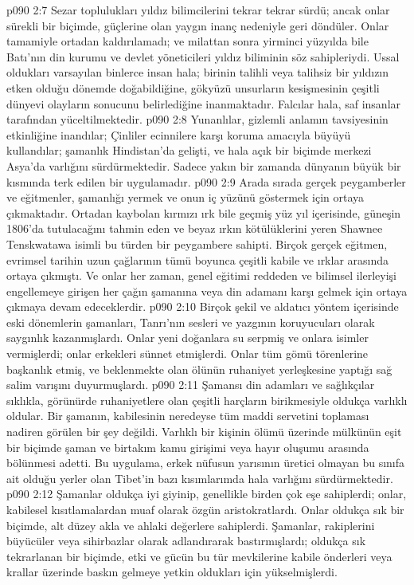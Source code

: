 \vs p090 2:7 Sezar toplulukları yıldız bilimcilerini tekrar tekrar sürdü; ancak onlar sürekli bir biçimde, güçlerine olan yaygın inanç nedeniyle geri döndüler. Onlar tamamiyle ortadan kaldırılamadı; ve milattan sonra yirminci yüzyılda bile Batı’nın din kurumu ve devlet yöneticileri yıldız biliminin söz sahipleriydi. Ussal oldukları varsayılan binlerce insan hala; birinin talihli veya talihsiz bir yıldızın etken olduğu dönemde doğabildiğine, gökyüzü unsurların kesişmesinin çeşitli dünyevi olayların sonucunu belirlediğine inanmaktadır. Falcılar hala, saf insanlar tarafından yüceltilmektedir.
\vs p090 2:8 Yunanlılar, gizlemli anlamın tavsiyesinin etkinliğine inandılar; Çinliler ecinnilere karşı koruma amacıyla büyüyü kullandılar; şamanlık Hindistan’da gelişti, ve hala açık bir biçimde merkezi Asya’da varlığını sürdürmektedir. Sadece yakın bir zamanda dünyanın büyük bir kısmında terk edilen bir uygulamadır.
\vs p090 2:9 Arada sırada gerçek peygamberler ve eğitmenler, şamanlığı yermek ve onun iç yüzünü göstermek için ortaya çıkmaktadır. Ortadan kaybolan kırmızı ırk bile geçmiş yüz yıl içerisinde, güneşin 1806’da tutulacağını tahmin eden ve beyaz ırkın kötülüklerini yeren Shawnee Tenskwatawa isimli bu türden bir peygambere sahipti. Birçok gerçek eğitmen, evrimsel tarihin uzun çağlarının tümü boyunca çeşitli kabile ve ırklar arasında ortaya çıkmıştı. Ve onlar her zaman, genel eğitimi reddeden ve bilimsel ilerleyişi engellemeye girişen her çağın şamanına veya din adamanı karşı gelmek için ortaya çıkmaya devam edeceklerdir.
\vs p090 2:10 Birçok şekil ve aldatıcı yöntem içerisinde eski dönemlerin şamanları, Tanrı’nın sesleri ve yazgının koruyucuları olarak saygınlık kazanmışlardı. Onlar yeni doğanlara su serpmiş ve onlara isimler vermişlerdi; onlar erkekleri sünnet etmişlerdi. Onlar tüm gömü törenlerine başkanlık etmiş, ve beklenmekte olan ölünün ruhaniyet yerleşkesine yaptığı sağ salim varışını duyurmuşlardı.
\vs p090 2:11 Şamansı din adamları ve sağlıkçılar sıklıkla, görünürde ruhaniyetlere olan çeşitli harçların birikmesiyle oldukça varlıklı oldular. Bir şamanın, kabilesinin neredeyse tüm maddi servetini toplaması nadiren görülen bir şey değildi. Varlıklı bir kişinin ölümü üzerinde mülkünün eşit bir biçimde şaman ve birtakım kamu girişimi veya hayır oluşumu arasında bölünmesi adetti. Bu uygulama, erkek nüfusun yarısının üretici olmayan bu sınıfa ait olduğu yerler olan Tibet’in bazı kısımlarımda hala varlığını sürdürmektedir.
\vs p090 2:12 Şamanlar oldukça iyi giyinip, genellikle birden çok eşe sahiplerdi; onlar, kabilesel kısıtlamalardan muaf olarak özgün aristokratlardı. Onlar oldukça sık bir biçimde, alt düzey akla ve ahlaki değerlere sahiplerdi. Şamanlar, rakiplerini büyücüler veya sihirbazlar olarak adlandırarak bastırmışlardı; oldukça sık tekrarlanan bir biçimde, etki ve gücün bu tür mevkilerine kabile önderleri veya krallar üzerinde baskın gelmeye yetkin oldukları için yükselmişlerdi.
